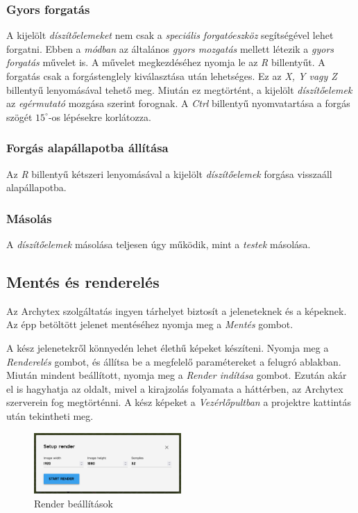 \subsubsection{Gyors forgatás}

A kijelölt \emph{díszítőelemeket} nem csak a \emph{speciális forgatóeszköz} segítségével lehet
forgatni. Ebben a \emph{módban} az általános \emph{gyors mozgatás} mellett létezik a
\emph{gyors forgatás} művelet is. A művelet megkezdéséhez nyomja le az \emph{R} billentyűt.
A forgatás csak a forgástenglely kiválasztása után lehetséges. Ez
az \emph{X, Y vagy Z} billentyű lenyomásával tehető meg. Miután ez megtörtént, a kijelölt
\emph{díszítőelemek} az \emph{egérmutató} mozgása szerint forognak. A \emph{Ctrl} billentyű
nyomvatartása a forgás szögét $15^{\circ}$-os lépésekre korlátozza.

\subsubsection{Forgás alapállapotba állítása}

Az \emph{R} billentyű kétszeri lenyomásával a kijelölt \emph{díszítőelemek} forgása visszaáll
alapállapotba.

\subsubsection{Másolás}

A \emph{díszítőelemek} másolása teljesen úgy működik, mint a \emph{testek} másolása.

\subsection{Mentés és renderelés}

Az Archytex szolgáltatás ingyen tárhelyet biztosít a jeleneteknek és a képeknek. Az épp betöltött
jelenet mentéséhez nyomja meg a \emph{Mentés} gombot.

A kész jelenetekről könnyedén lehet élethű képeket készíteni. Nyomja meg a \emph{Renderelés} gombot,
és állítsa be a megfelelő paramétereket a felugró ablakban. Miután mindent beállított, nyomja meg
a \emph{Render indítása} gombot. Ezután akár el is hagyhatja az oldalt, mivel a kirajzolás
folyamata a háttérben, az Archytex szerverein fog megtörténni. A kész képeket a \emph{Vezérlőpultban} a projektre kattintás után tekintheti
meg.

\begin{figure}[h]
    \centering
    \includegraphics[width=0.5\textwidth]{parts/user-documentation/editor/images/render.png}
    \caption{Render beállítások}
\end{figure}